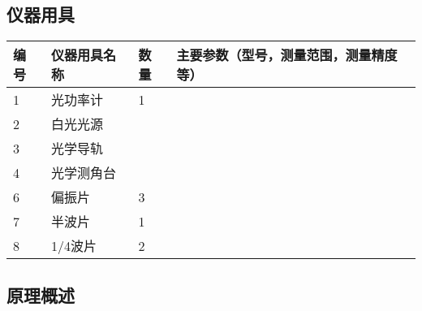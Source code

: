 \documentclass[dvipsnames, svgnames,a4paper,11pt]{article}
\begin{document}
\subsection{仪器用具}
\begin{table}[htbp]
	\centering
	\renewcommand\arraystretch{1.6}
	\begin{tabular}{p{}|p{}|p{}|p{}}
	\hline
	编号& 仪器用具名称 & 数量 &  主要参数（型号，测量范围，测量精度等） \\
	\hline
	1&光功率计 	&1 	& \\

	2&白光光源 	& 	&  \\
	
	3&光学导轨 	&  & \\
	
	4&光学测角台& & \\
	
	6&偏振片	&3 & \\

	7&半波片	&1 & \\

	8&1/4波片	&2 & \\

	
	\hline
\end{tabular}
\end{table}

\subsection{原理概述}
\end{document}
